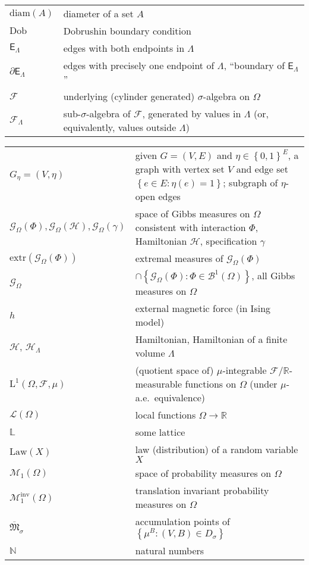 \documentclass[12pt]{article}
\newcommand{\BB}{\mathscr{B}}
\newcommand{\E}{\mathsf{E}}
\newcommand{\F}{\mathcal{F}}
\newcommand{\G}{\mathcal{G}}
\renewcommand{\H}{\mathcal{H}}
\newcommand{\Loc}{\mathcal{L}}
\renewcommand{\L}{\mathbb{L}}
\newcommand{\M}{\mathcal{M}}
\newcommand{\N}{\mathbb{N}}
\newcommand{\R}{\mathbb{R}}
\newcommand{\extr}{\mathrm{extr}}
\newcommand{\set}[1]{\left\{#1\right\}}
\newcommand{\ra}{\rightarrow}
\newcommand{\1}{\mathbbm{1}}
\newcommand{\5}{\vspace{0.5cm}}
\theoremstyle{definition}
\begin{document}
\begin{tabular}{p{4cm}p{10cm}}
$\mathrm{diam}(A)$ & diameter of a set $A$ \\
$\mathrm{Dob}$ & Dobrushin boundary condition \\
$\E_\Lambda$ & edges with both endpoints in $\Lambda$ \\
$\partial\E_\Lambda$ & edges with precisely one endpoint of $\Lambda$, ``boundary of $\E_\Lambda$'' \\
$\F$ & underlying (cylinder generated) $\sigma$-algebra on $\Omega$ \\
$\F_\Lambda$ & sub-$\sigma$-algebra of $\F$, generated by values in $\Lambda$ (or, equivalently, values outside $\Lambda$)  
\end{tabular} 

\pagebreak

\begin{tabular}{p{4cm}p{10cm}}
$G_\eta=(V,\eta)$ & given $G=(V,E)$ and $\eta\in\set{0,1}^E$, a graph with vertex set $V$ and edge set $\set{e\in E:\eta(e)=1}$; subgraph of $\eta$-open edges \\
$\G_\Omega(\Phi),\G_\Omega(\H),\G_\Omega(\gamma)$ & space of Gibbs measures on $\Omega$ consistent with interaction $\Phi$, Hamiltonian $\H$, specification $\gamma$\\
$\extr(\G_\Omega(\Phi))$ & extremal measures of $\G_\Omega(\Phi)$ \\
$\G_\Omega$ & $\cap\set{\G_\Omega(\Phi):\Phi\in\BB^1(\Omega)}$, all Gibbs measures on $\Omega$ \\
$h$ & external magnetic force (in Ising model) \\
$\H$, $\H_\Lambda$ & Hamiltonian, Hamiltonian of a finite volume $\Lambda$ \\
$\mathrm{L}^1(\Omega,\F,\mu)$ & (quotient space of) $\mu$-integrable $\F/\R$-measurable functions on $\Omega$ (under $\mu$-a.e.~equivalence) \\
$\Loc(\Omega)$ & local functions $\Omega\ra\R$ \\
$\L$ & some lattice \\
$\mathrm{Law}(X)$ & law (distribution) of a random variable $X$ \\
$\M_1(\Omega)$ & space of probability measures on $\Omega$ \\
$\M_1^{\mathrm{inv}}(\Omega)$ & translation invariant probability measures on $\Omega$ \\
$\overline{\mathfrak{M}}_{\sigma}$ & accumulation points of $\set{\mu^B:(V,B)\in D_\sigma}$ \\
$\N$ & natural numbers \\

\end{tabular}
\end{document}

